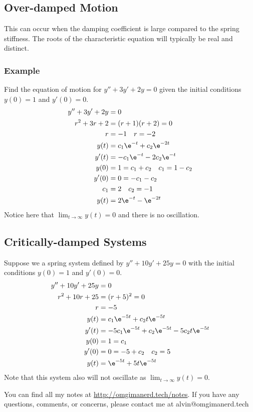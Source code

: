 \documentclass{math}
\begin{document}
\subsection*{Over-damped Motion}
This can occur when the damping coefficient is large compared to the spring
stiffness. The roots of the characteristic equation will typically be real
and distinct.

\subsubsection*{Example}
Find the equation of motion for \( y''+3y'+2y = 0 \) given the initial
conditions \( y(0) = 1 \) and \( y'(0) = 0 \).
\begin{align*}
  y''+3y'+2y &= 0 \\
  r^2+3r+2 &= (r+1)(r+2) = 0 \\
  r &= -1 \quad r = -2 \\
  y(t) &= c_1\e^{-t}+c_2\e^{-2t} \\
  y'(t) &= -c_1\e^{-t}-2c_2\e^{-t} \\
  y(0) &= 1 = c_1+c_2 \quad c_1 = 1-c_2 \\
  y'(0) &= 0 = -c_1-c_2 \\
  c_1 &= 2 \quad c_2 = -1 \\
  y(t) &= 2\e^{-t}-\e^{-2t}
\end{align*}
Notice here that \( \lim_{t\to\infty}y(t) = 0 \) and there is no oscillation.

\subsection*{Critically-damped Systems}
Suppose we a spring system defined by \( y''+10y'+25y = 0 \) with the initial
conditions \( y(0) = 1 \) and \( y'(0) = 0 \).
\begin{align*}
  y''+10y'+25y &= 0 \\
  r^2+10r+25 &= (r+5)^2 = 0 \\
  r &= -5 \\
  y(t) &= c_1\e^{-5t}+c_2t\e^{-5t} \\
  y'(t) &= -5c_1\e^{-5t}+c_2\e^{-5t}-5c_2t\e^{-5t} \\
  y(0) &= 1 = c_1 \\
  y'(0) &= 0 = -5+c_2 \quad c_2 = 5 \\
  y(t) &= \e^{-5t}+5t\e^{-5t}
\end{align*}
Note that this system also will not oscillate as \( \lim_{t\to\infty}y(t) =
0 \).

\begin{center}
  You can find all my notes at \url{http://omgimanerd.tech/notes}. If you have
  any questions, comments, or concerns, please contact me at
  alvin@omgimanerd.tech
\end{center}
\end{document}
